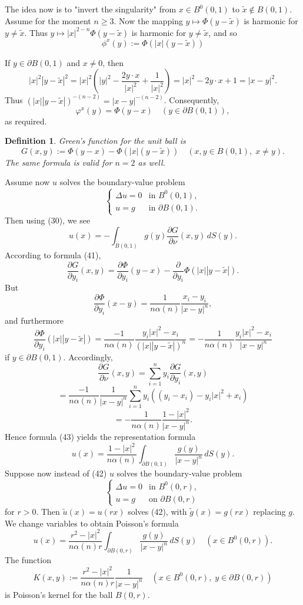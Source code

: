 \documentclass[a4paper,12pt]{report}
\newtheorem{definition}{Definition}[section]
\begin{document}
The idea now is to "invert the singularity" from \( x \in B^0(0, 1) \) to \( \tilde{x} \notin B(0, 1) \). Assume for the moment \( n \geq 3 \). Now the mapping \( y \mapsto \Phi(y - \tilde{x}) \) is harmonic for \( y \neq \tilde{x} \). Thus \( y \mapsto |x|^{2 - n} \Phi(y - \tilde{x}) \) is harmonic for \( y \neq \tilde{x} \), and so
\[
\phi^x(y) := \Phi(|x| (y - \tilde{x})) \tag{39}
\]

If \( y \in \partial B(0,1) \) and \( x \neq 0 \), then
\[
|x|^2 |y - \tilde{x}|^2 = |x|^2 \left( |y|^2 - \frac{2y \cdot x}{|x|^2} + \frac{1}{|x|^2} \right) = |x|^2 - 2y \cdot x + 1 = |x - y|^2.
\]
Thus \((|x||y - \tilde{x}|)^{-(n-2)} = |x - y|^{-(n-2)}\). Consequently,
\[
\varphi^x(y) = \Phi(y - x) \quad (y \in \partial B(0,1)), \tag{40}
\]
as required.
\begin{definition}
Green's function for the unit ball is
\[
G(x,y) := \Phi(y - x) - \Phi(|x| (y - \tilde{x})) \quad (x, y \in B(0,1), \; x \neq y).
\]
The same formula is valid for \( n = 2 \) as well.
\end{definition}
Assume now \( u \) solves the boundary-value problem
\[
\begin{cases}
\Delta u = 0 & \text{in } B^0(0,1), \\
u = g & \text{in } \partial B(0,1).
\end{cases} \tag{42}
\]
Then using (30), we see
\[
u(x) = - \int_{B(0,1)} g(y) \frac{\partial G}{\partial \nu}(x, y) \, dS(y). \tag{43}
\]
According to formula (41),
\[
\frac{\partial G}{\partial y_i}(x, y) = \frac{\partial \Phi}{\partial y_i}(y - x) - \frac{\partial}{\partial y_i} \Phi(|x| |y - \tilde{x}|).
\]
But
\[
\frac{\partial \Phi}{\partial y_i}(x - y) = \frac{1}{n \alpha(n)} \frac{x_i - y_i}{|x - y|^n},
\]
and furthermore
\[
\frac{\partial \Phi}{\partial y_i}(|x| |y - \tilde{x}|) = \frac{-1}{n \alpha(n)} \frac{y_i |x|^2 - x_i}{(|x| |y - \tilde{x}|)^n} = -\frac{1}{n \alpha(n)} \frac{y_i |x|^2 - x_i}{|x - y|^n}
\]
if \( y \in \partial B(0,1) \). Accordingly,
\[
\frac{\partial G}{\partial \nu}(x, y) = \sum_{i=1}^n y_i \frac{\partial G}{\partial y_i}(x, y)
\]
\[
= \frac{-1}{n \alpha(n)} \frac{1}{|x - y|^n} \sum_{i=1}^n y_i ((y_i - x_i) - y_i |x|^2 + x_i)
\]
\[
= -\frac{1}{n \alpha(n)} \frac{1 - |x|^2}{|x - y|^n}.
\]
Hence formula (43) yields the representation formula
\[
u(x) = \frac{1 - |x|^2}{n \alpha(n)} \int_{\partial B(0,1)} \frac{g(y)}{|x - y|^n} \, dS(y).
\]
Suppose now instead of (42) \( u \) solves the boundary-value problem
\[
\begin{cases}
\Delta u = 0 & \text{in } B^0(0, r), \\
u = g & \text{on } \partial B(0, r)
\end{cases}
\tag{44}
\]
for \( r > 0 \). Then \( \tilde{u}(x) = u(rx) \) solves (42), with \( \tilde{g}(x) = g(rx) \) replacing \( g \).
We change variables to obtain Poisson's formula
\[
u(x) = \frac{r^2 - |x|^2}{n \alpha(n) r} \int_{\partial B(0, r)} \frac{g(y)}{|x - y|^n} \, dS(y) \quad (x \in B^0(0, r)).
\tag{45}
\]
The function
\[
K(x, y) := \frac{r^2 - |x|^2}{n \alpha(n) r} \frac{1}{|x - y|^n} \quad \left( x \in B^0(0, r), \; y \in \partial B(0, r) \right)
\]
is Poisson's kernel for the ball \( B(0, r) \).
\end{document}
